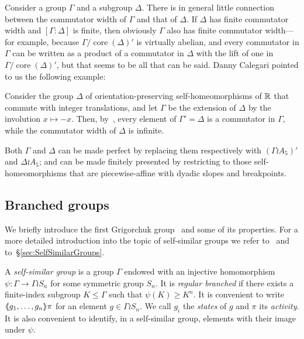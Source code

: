 \documentclass[a4paper,11pt]{amsart}
\begin{document}
Consider a group $\Gamma$ and a subgroup $\Delta$. There is in general
little connection between the commutator width of $\Gamma$ and that of
$\Delta$. If $\Delta$ has finite commutator width and
$[\Gamma:\Delta]$ is finite, then obviously $\Gamma$ also has finite
commutator width---for example, because
$\Gamma/\operatorname{core}(\Delta)'$ is virtually abelian, and every
commutator in $\Gamma$ can be written as a product of a commutator in
$\Delta$ with the lift of one in
$\Gamma/\operatorname{core}(\Delta)'$, but that seems to be all that
can be said. Danny Calegari pointed to us the following example:
\begin{ex}\label{ex:commwidthsubgroup}
  Consider the group $\Delta$ of orientation-preserving
  self-homeomorphisms of $\mathbb{R}$ that commute with integer translations,
  and let $\Gamma$ be the extension of $\Delta$ by the involution
  $x\mapsto-x$. Then, by~\cite[Theorems~2.3
  and~2.4]{Eisenbud-Hirsch-Neumann:SeifertBundles}, every element of
  $\Gamma'=\Delta$ is a commutator in $\Gamma$, while the commutator
  width of $\Delta$ is infinite.

  Both $\Gamma$ and $\Delta$ can be made perfect by replacing them
  respectively with $(\Gamma\wr A_5)'$ and $\Delta\wr A_5$; and can be
  made finitely presented by restricting to those self-homeo\-mor\-phisms
  that are piecewise-affine with dyadic slopes and breakpoints.
\end{ex}

\subsection{Branched groups}\label{ss:bg}
We briefly introduce the first Grigorchuk
group~\cite{Grigorchuk:Burnside} and some of its properties. For a more
detailed introduction into the topic of self-similar groups we refer
to~\cite{Bartholdi-Grigorchuk-Sunik:BranchGroups,Nekrashevych:SelfSimilarGroups} and
to~\S\ref{sec:SelfSimilarGroups}.

A \emph{self-similar group} is a group $\Gamma$ endowed with an
injective homomorphism $\psi\colon\Gamma\to\Gamma\wr S_n$ for some
symmetric group $S_n$. It is \emph{regular branched} if there exists a
finite-index subgroup $K\le\Gamma$ such that $\psi(K)\ge K^n$. It is
convenient to write $\langle\negthickspace\langle g_1,\dots,g_n\rangle\negthickspace\rangle\pi$ for an element
$g\in\Gamma\wr S_n$. We call $g_i$ the \emph{states} of $g$ and $\pi$
its \emph{activity}. It is also convenient to identify, in a
self-similar group, elements with their image under $\psi$.
\end{document}
